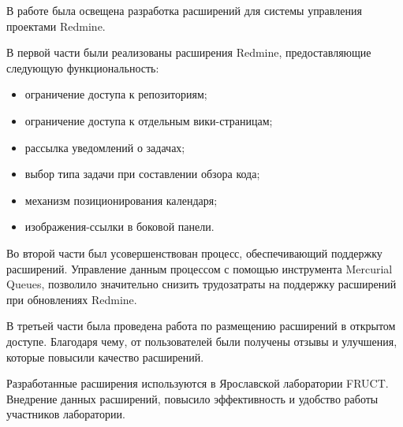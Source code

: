 
В работе была освещена разработка расширений для системы управления проектами
Redmine.

В первой части были реализованы расширения Redmine, предоставляющие
следующую функциональность:
\begin{itemize}
  \item ограничение доступа к репозиториям;
  \item ограничение доступа к отдельным вики-страницам;
  \item рассылка уведомлений о задачах; 
  \item выбор типа задачи при составлении обзора кода;
  \item механизм позиционирования календаря;
  \item изображения-ссылки в боковой панели.
\end{itemize}

Во второй части был усовершенствован процесс, обеспечивающий поддержку
расширений. Управление данным процессом с помощью инструмента Mercurial Queues,
позволило значительно снизить трудозатраты на поддержку расширений при
обновлениях Redmine.

В третьей части была проведена работа по размещению расширений в открытом
доступе. Благодаря чему, от пользователей были получены отзывы и улучшения,
которые повысили качество расширений.

Разработанные расширения используются в Ярославской лаборатории FRUCT.
Внедрение данных расширений, повысило эффективность и удобство работы
участников лаборатории.

